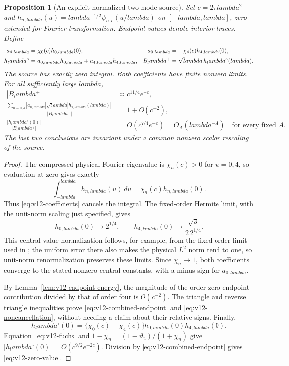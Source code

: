 \documentclass[11pt]{article}
\def\lambda{lambda}%
\newtheorem{proposition}[theorem]{Proposition}
\theoremstyle{remark}
\begin{document}
\begin{proposition}[An explicit normalized two-mode source]
\label{prop:v12-source}
Set $c=2\pi\lambda^2$ and
$h_{n,\lambda}(u)=\lambda^{-1/2}\psi_{n,c}(u/\lambda)$ on
$[-\lambda,\lambda]$, zero-extended for Fourier transformation.
Endpoint values denote interior traces. Define
\begin{align}
 a_{4,\lambda}&=\chi_0(c)h_{0,\lambda}(0),&
 a_{0,\lambda}&=-\chi_4(c)h_{4,\lambda}(0),\label{eq:v12-coefficients}\\
 h_\lambda^\circ&=a_{0,\lambda}h_{0,\lambda}
                 +a_{4,\lambda}h_{4,\lambda},&
 B_\lambda^+&=\sqrt\lambda\,h_\lambda^\circ(\lambda).
 \notag
\end{align}
The source has exactly zero integral. Both coefficients have finite
nonzero limits. For all sufficiently large $\lambda$,
\begin{align}
 |B_\lambda^+|&\asymp c^{11/4}e^{-c},\label{eq:v12-combined-endpoint}\\
 \frac{\sum_{n=0,4}|a_{n,\lambda}|\sqrt\lambda
                 |h_{n,\lambda}(\lambda)|}{|B_\lambda^+|}
     &=1+O(c^{-2}),\label{eq:v12-noncancellation}\\
 \frac{|h_\lambda^\circ(0)|}{|B_\lambda^+|}
     &=O(c^{7/4}e^{-c})=O_A(\lambda^{-A})
       \quad\text{for every fixed }A.\label{eq:v12-zero-value}
\end{align}
The last two conclusions are invariant under a common nonzero scalar
rescaling of the source.
\end{proposition}
\begin{proof}
The compressed physical Fourier eigenvalue is $\chi_n(c)>0$ for
$n=0,4$, so evaluation at zero gives exactly
\[
 \int_{-\lambda}^{\lambda}h_{n,\lambda}(u)\,du
       =\chi_n(c)h_{n,\lambda}(0).
\]
Thus \eqref{eq:v12-coefficients} cancels the integral. The fixed-order
Hermite limit, with the unit-norm scaling just specified, gives
\[
 h_{0,\lambda}(0)\longrightarrow2^{1/4},\qquad
 h_{4,\lambda}(0)\longrightarrow
       \frac{\sqrt3}{2\,2^{1/4}}.
\]
This central-value normalization follows, for example, from the
fixed-order limit used in \cite[Lemma~7.2]{ConnesConsaniMoscovici2025};
the uniform error there also makes the physical $L^2$ norm tend to one,
so unit-norm renormalization preserves these limits. Since $\chi_n\to1$,
both coefficients converge to the stated nonzero central constants,
with a minus sign for $a_{0,\lambda}$.

By Lemma~\ref{lem:v12-endpoint-energy}, the magnitude of the order-zero
endpoint contribution divided by that of order four is $O(c^{-2})$.
The triangle and reverse triangle inequalities prove
\eqref{eq:v12-combined-endpoint} and \eqref{eq:v12-noncancellation},
without needing a claim about their relative signs. Finally,
\[
 h_\lambda^\circ(0)
   =\{\chi_0(c)-\chi_4(c)\}
       h_{0,\lambda}(0)h_{4,\lambda}(0).
\]
Equation~\eqref{eq:v12-fuchs} and
$1-\chi_n=(1-\vartheta_n)/(1+\chi_n)$ give
$|h_\lambda^\circ(0)|=O(c^{9/2}e^{-2c})$.
Division by \eqref{eq:v12-combined-endpoint} gives
\eqref{eq:v12-zero-value}.
\end{proof}
\end{document}
